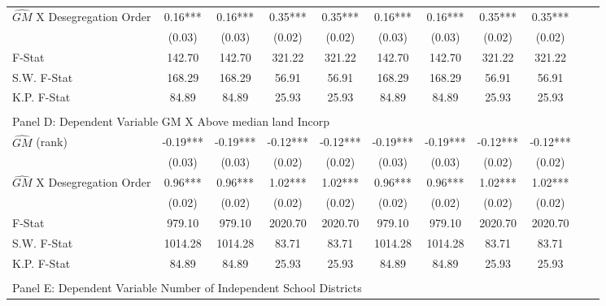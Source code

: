 \begin{table}[htbp]
\begin{threeparttable}
\begin{tabular}{l*{10}{c}}
\addlinespace
$\hat{GM}$ X Desegregation Order&       0.16***&       0.16***&       0.35***&       0.35***&       0.16***&       0.16***&       0.35***&       0.35***\\
                &     (0.03)   &     (0.03)   &     (0.02)   &     (0.02)   &     (0.03)   &     (0.03)   &     (0.02)   &     (0.02)   \\
\midrule
F-Stat          &     142.70   &     142.70   &     321.22   &     321.22   &     142.70   &     142.70   &     321.22   &     321.22   \\
S.W. F-Stat     &     168.29   &     168.29   &      56.91   &      56.91   &     168.29   &     168.29   &      56.91   &      56.91   \\
K.P. F-Stat     &      84.89   &      84.89   &      25.93   &      25.93   &      84.89   &      84.89   &      25.93   &      25.93   \\
\cmidrule[\heavyrulewidth](lr){1-9} \\ \cmidrule[\heavyrulewidth](lr){1-9}
\multicolumn{8}{l}{Panel D: Dependent Variable GM X Above median land Incorp}\\
\cmidrule(lr){1-9}
$\hat{GM}$ (rank)&      -0.19***&      -0.19***&      -0.12***&      -0.12***&      -0.19***&      -0.19***&      -0.12***&      -0.12***\\
                &     (0.03)   &     (0.03)   &     (0.02)   &     (0.02)   &     (0.03)   &     (0.03)   &     (0.02)   &     (0.02)   \\
\addlinespace
$\hat{GM}$ X Desegregation Order&       0.96***&       0.96***&       1.02***&       1.02***&       0.96***&       0.96***&       1.02***&       1.02***\\
                &     (0.02)   &     (0.02)   &     (0.02)   &     (0.02)   &     (0.02)   &     (0.02)   &     (0.02)   &     (0.02)   \\
\midrule
F-Stat          &     979.10   &     979.10   &    2020.70   &    2020.70   &     979.10   &     979.10   &    2020.70   &    2020.70   \\
S.W. F-Stat     &    1014.28   &    1014.28   &      83.71   &      83.71   &    1014.28   &    1014.28   &      83.71   &      83.71   \\
K.P. F-Stat     &      84.89   &      84.89   &      25.93   &      25.93   &      84.89   &      84.89   &      25.93   &      25.93   \\
\cmidrule[\heavyrulewidth](lr){1-9} \\ \cmidrule[\heavyrulewidth](lr){1-9}
\multicolumn{8}{l}{Panel E: Dependent Variable Number of Independent School Districts}\\

\end{tabular}
\end{threeparttable}
\end{table}
